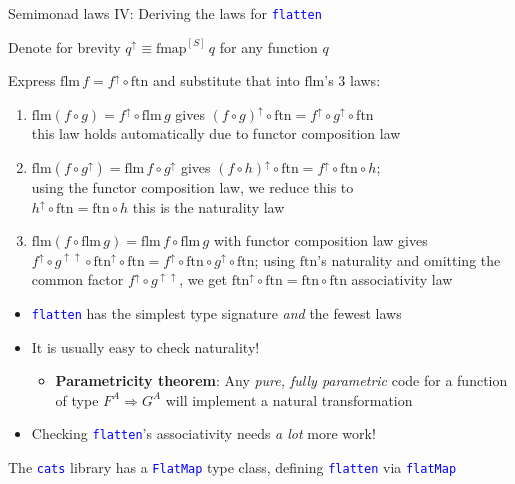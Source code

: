 \documentclass[english]{beamer}
\begin{document}
\begin{frame}{Semimonad laws IV: Deriving the laws for \texttt{\textcolor{blue}{\footnotesize{}flatten}} }

Denote for brevity $q^{\uparrow}\equiv\text{fmap}^{\left[S\right]}\,q$
for any function $q$

Express $\text{flm}\,f=f^{\uparrow}\circ\text{ftn}$ and substitute
that into $\text{flm}$'s 3 laws:
\begin{enumerate}
\item {\footnotesize{}$\text{flm}\left(f\circ g\right)=f^{\uparrow}\circ\text{flm}\,g$}
gives {\footnotesize{}$\left(f\circ g\right)^{\uparrow}\circ\text{ftn}=f^{\uparrow}\circ g^{\uparrow}\circ\text{ftn}$}\\
\textendash{} this law holds automatically due to functor composition
law
\item {\footnotesize{}$\text{flm}\left(f\circ g^{\uparrow}\right)=\text{flm}\,f\circ g^{\uparrow}$}
gives {\footnotesize{}$\left(f\circ h\right)^{\uparrow}\circ\text{ftn}=f^{\uparrow}\circ\text{ftn}\circ h$};\\
using the functor composition law, we reduce this to\\
{\footnotesize{}$h^{\uparrow}\circ\text{ftn}=\text{ftn}\circ h$}
\textendash{} this is the naturality law
\item {\footnotesize{}$\text{flm}\left(f\circ\text{flm}\,g\right)=\text{flm}\,f\circ\text{flm}\,g$
}with functor composition law gives{\footnotesize{} $f^{\uparrow}\circ g^{\uparrow\uparrow}\circ\text{ftn}^{\uparrow}\circ\text{ftn}=f^{\uparrow}\circ\text{ftn}\circ g^{\uparrow}\circ\text{ftn}$;}
using {\footnotesize{}$\text{ftn}$}'s naturality and omitting the
common factor{\footnotesize{} $f^{\uparrow}\circ g^{\uparrow\uparrow}$},
we get{\footnotesize{} $\text{ftn}^{\uparrow}\circ\text{ftn}=\text{ftn}\circ\text{ftn}$}
\textendash{} associativity law
\end{enumerate}
\begin{itemize}
\item \texttt{\textcolor{blue}{\footnotesize{}flatten}} has the simplest
type signature \emph{and} the fewest laws
\item It is usually easy to check naturality!
\begin{itemize}
\item \textbf{Parametricity theorem}: Any \emph{pure, fully parametric}
code for a function of type $F^{A}\Rightarrow G^{A}$ will implement
a natural transformation
\end{itemize}
\item Checking \texttt{\textcolor{blue}{\footnotesize{}flatten}}'s associativity
needs \emph{a lot} more work!
\end{itemize}
The \texttt{\textcolor{blue}{\footnotesize{}cats}} library has a \texttt{\textcolor{blue}{\footnotesize{}FlatMap}}
type class, defining \texttt{\textcolor{blue}{\footnotesize{}flatten}}
via \texttt{\textcolor{blue}{\footnotesize{}flatMap}} 
\end{frame}
\end{document}
